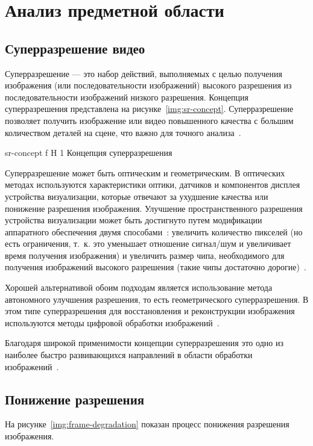 \documentclass{bmstu}
\begin{document}
\chapter{Анализ предметной области}

\section{Суперразрешение видео}

Суперразрешение --- это набор действий, выполняемых с целью получения изображения (или последовательности изображений) высокого разрешения из последовательности изображений низкого разрешения. 
Концепция суперразрешения представлена на рисунке~\ref{img:sr-concept}. 
Суперразрешение позволяет получить изображение или видео повышенного качества с большим количеством деталей на сцене, что важно для точного анализа~\cite{Daithankar2021}. 

    {sr-concept}
    {f}
    {H}
    {1\textwidth}
    {Концепция суперразрешения~\cite{Daithankar2021}}

Суперразрешение может быть оптическим и геометрическим. 
В оптических методах используются характеристики оптики, датчиков и компонентов дисплея устройства визуализации, которые отвечают за ухудшение качества или понижение разрешения изображения. 
Улучшение пространственного разрешения устройства визуализации может быть достигнуто путем модификации аппаратного обеспечения двумя способами~\cite{Daithankar2021}: увеличить количество пикселей (но есть ограничения, т.~к. это уменьшает отношение сигнал/шум и увеличивает время получения изображения) и увеличить размер чипа, необходимого для получения изображений высокого разрешения (такие чипы достаточно дорогие)~\cite{Park2003}.

Хорошей альтернативой обоим подходам является использование метода автономного улучшения разрешения, то есть геометрического суперразрешения. 
В этом типе суперразрешения для восстановления и реконструкции изображения используются методы цифровой обработки изображений~\cite{Daithankar2021}.

Благодаря широкой применимости концепции суперразрешения это одно из наиболее быстро развивающихся направлений в области обработки изображений~\cite{Yue2016}.

\section{Понижение разрешения}

На рисунке~\ref{img:frame-degradation} показан процесс понижения разрешения изображения.
\end{document}
